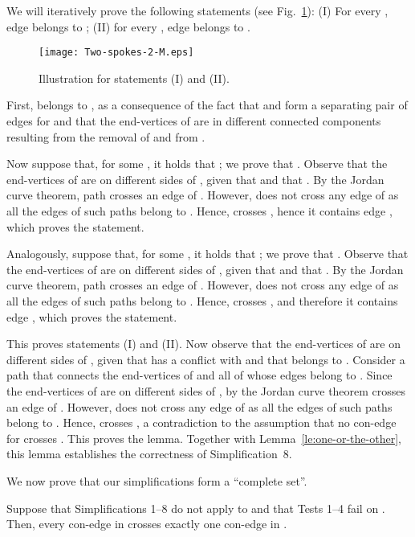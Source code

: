\documentclass[letter,runningheads]{llncs}
\renewenvironment{proof}
{{\em Proof.\ }}{\hspace*{\fill}\par\vspace{2mm}}
\begin{document}
\begin{proof}
We will iteratively prove the following statements (see  Fig.~\ref{fig:two-spokes-2}): (I) For every , edge  belongs to ; (II) for every , edge  belongs to .

\begin{figure}[tb]
\begin{center}
\mbox{\texttt{[image: Two-spokes-2-M.eps]}}
\caption{Illustration for statements (I) and (II).}
\label{fig:two-spokes-2}
\end{center}
\end{figure}

First,  belongs to , as a consequence of the fact that  and  form a separating pair of edges for  and that the end-vertices of  are in different connected components resulting from the removal of  and  from .

Now suppose that, for some , it holds that ; we prove that . Observe that the end-vertices of  are on different sides of , given that  and that . By the Jordan curve theorem, path  crosses an edge of . However,  does not cross any edge of  as all the edges of such paths belong to . Hence,  crosses , hence it contains edge , which proves the statement.

Analogously, suppose that, for some , it holds that ; we prove that . Observe that the end-vertices of  are on different sides of , given that  and that . By the Jordan curve theorem, path  crosses an edge of . However,  does not cross any edge of  as all the edges of such paths belong to . Hence,  crosses , and therefore it contains edge , which proves the statement.

This proves statements (I) and (II). Now observe that the end-vertices of  are on different sides of , given that  has a conflict with  and that  belongs to . Consider a path  that connects the end-vertices of  and all of whose edges belong to . Since the end-vertices of  are on different sides of , by the Jordan curve theorem  crosses an edge of . However,  does not cross any edge of  as all the edges of such paths belong to . Hence,  crosses , a contradiction to the assumption that no con-edge for  crosses . This proves the lemma. Together with Lemma~\ref{le:one-or-the-other}, this lemma establishes the correctness of {\sc Simplification~8}.
\end{proof}

We now prove that our simplifications form a ``complete set''.
\begin{lemma} \label{le:no-simplification-single-conflict}
Suppose that {\sc Simplifications 1--8} do not apply to  and that {\sc Tests 1--4} fail on . Then, every con-edge in  crosses exactly one con-edge in .
\end{lemma}
\end{document}
